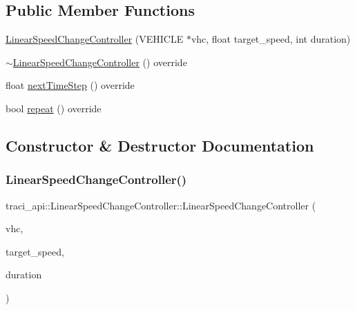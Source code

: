 \subsection*{Public Member Functions}
\begin{DoxyCompactItemize}
\item 
\hyperlink{classtraci__api_1_1_linear_speed_change_controller_a60f7ef2214d9cd72e7393293c234afa5}{Linear\+Speed\+Change\+Controller} (V\+E\+H\+I\+C\+LE $\ast$vhc, float target\+\_\+speed, int duration)
\item 
\hyperlink{classtraci__api_1_1_linear_speed_change_controller_abb54e5cb6b7befd773ce9bf28df1779f}{$\sim$\+Linear\+Speed\+Change\+Controller} () override
\item 
float \hyperlink{classtraci__api_1_1_linear_speed_change_controller_a31e52d6f77c96a88dda160226335bacd}{next\+Time\+Step} () override
\item 
bool \hyperlink{classtraci__api_1_1_linear_speed_change_controller_aaa5f31ea0c57db838a5786509fc03446}{repeat} () override
\end{DoxyCompactItemize}


\subsection{Constructor \& Destructor Documentation}
\mbox{\label{classtraci__api_1_1_linear_speed_change_controller_a60f7ef2214d9cd72e7393293c234afa5}} 
\subsubsection{\texorpdfstring{Linear\+Speed\+Change\+Controller()}{LinearSpeedChangeController()}}
{\footnotesize\ttfamily traci\+\_\+api\+::\+Linear\+Speed\+Change\+Controller\+::\+Linear\+Speed\+Change\+Controller (\begin{DoxyParamCaption}\item[{V\+E\+H\+I\+C\+LE $\ast$}]{vhc,  }\item[{float}]{target\+\_\+speed,  }\item[{int}]{duration }\end{DoxyParamCaption})}

